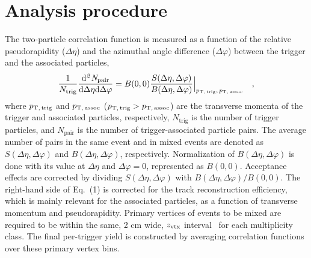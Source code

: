 \section{Analysis procedure}
\label{sec:ana}
The two-particle correlation function is measured as a function of the relative pseudorapidity ($\Delta\eta$) and the azimuthal angle difference ($\Delta\varphi$) between the trigger and the associated particles,
\begin{eqnarray}
\frac{1}{N_{\rm{trig}}} \frac{ \rm{d}\it{}^{2} N_{\rm{pair}} }{ \rm{d} \Delta\eta \rm{d}\Delta\varphi} = B(0, 0)\frac{S(\Delta\eta, \Delta\varphi)}{B(\Delta\eta, \Delta\varphi)}  \Big\lvert_{p_\mathrm{T,\,trig},\,p_\mathrm{T,\,assoc}}\quad , 
\label{eq:corrfunction}
\end{eqnarray}
where $p_\mathrm{T,\,trig}$ and $p_\mathrm{T,\,assoc}$ ($p_\mathrm{T,\,trig}>p_\mathrm{T,\,assoc}$) are the transverse momenta of the trigger and associated particles, respectively, $N_\mathrm{trig}$ is the number of trigger particles, and $N_\mathrm{pair}$ is the number of trigger-associated particle pairs. The average number of pairs in the same event and in mixed events are denoted as $S(\Delta\eta, \Delta\varphi)$ and $B(\Delta\eta, \Delta\varphi)$, respectively. Normalization of $B(\Delta\eta, \Delta\varphi)$ is done with its value at $\Delta\eta$ and $\Delta\varphi = 0$, represented as $B (0,0)$. Acceptance effects are corrected by dividing $S(\Delta\eta, \Delta\varphi)$ with $B(\Delta\eta, \Delta\varphi)/B (0,0)$. The right-hand side of Eq.~(1) is corrected for the track reconstruction efficiency, which is mainly relevant for the associated particles, as a function of transverse momentum and pseudorapidity. Primary vertices of events to be mixed are required to be within the same, 2 cm wide, $z_{\rm{vtx}}$ interval~\cite{KOPYLOV1974472:evtmixing,Adam:2016tsv} for each multiplicity class. The final per-trigger yield is constructed by averaging correlation functions over these primary vertex bins.

